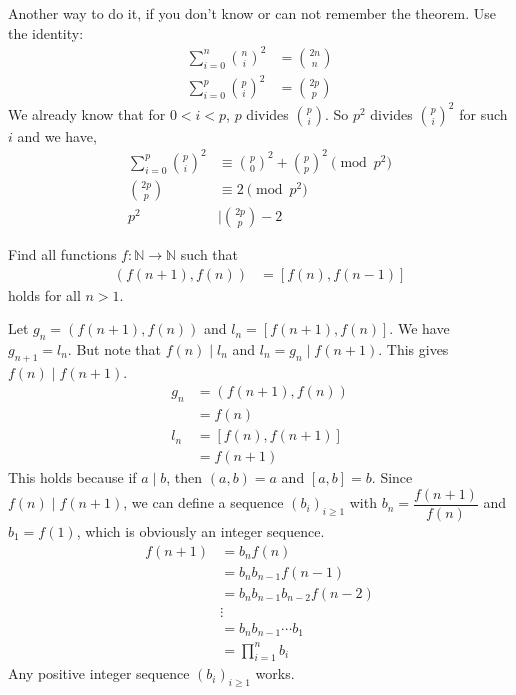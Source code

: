 \documentclass[problems.tex]{subfile}
\begin{document}
	\begin{remark}
		Another way to do it, if you don't know or can not remember the theorem. Use the identity:
			\begin{align*}
				\sum_{i=0}^{n}\binom ni^2 & = \binom{2n}{n}\\
				\sum_{i=0}^{p}\binom pi^2 & = \binom{2p}p
			\end{align*}
		We already know that for $0<i<p$, $p$ divides $\binom pi$. So $p^2$ divides $\binom pi^2$ for such $i$ and we have,
			\begin{align*}
				\sum_{i=0}^{p} \binom{p}{i}^2& \equiv \binom{p}0^2+\binom pp^2\pmod {p^2}\\
				\binom{2p}p & \equiv2\pmod{p^2}\\
				p^2 & \mid  \binom{2p}p-2
			\end{align*}
	\end{remark}

	\begin{problem}
		Find all functions $f:\mathbb{N}\to\mathbb{N}$ such that
			\begin{align*}
				(f(n+1),f(n)) & = [f(n),f(n-1)]
			\end{align*}
		holds for all $n>1$.
	\end{problem}

	\begin{solution}
		Let $g_n=(f(n+1),f(n))$ and $l_n=[f(n+1),f(n)]$. We have $g_{n+1} = l_n$. But note that $f(n)\mid l_n$ and $l_n=g_n\mid f(n+1)$. This gives $f(n)\mid f(n+1)$.
			\begin{align*}
				g_n
					& =(f(n+1),f(n))\\
					& =f(n)\\
				l_n
					& =[f(n),f(n+1)]\\
					& =f(n+1)
			\end{align*}
		This holds because if $a\mid b$, then $(a,b)=a$ and $[a,b]=b$. Since $f(n)\mid f(n+1)$, we can define a sequence $(b_i)_{i\geq1}$ with $b_n=\dfrac{f(n+1)}{f(n)}$ and $b_1=f(1)$, which is obviously an integer sequence.
			\begin{align*}
				f(n+1)  & = b_nf(n)\\
						& = b_nb_{n-1}f(n-1)\\
						& = b_nb_{n-1}b_{n-2}f(n-2)\\
						&  \vdots\\
						& = b_nb_{n-1}\cdots b_1\\
						& = \prod_{i=1}^{n}b_i
			\end{align*}
		Any positive integer sequence $(b_i)_{i\geq1}$ works.
	\end{solution}
\end{document}
